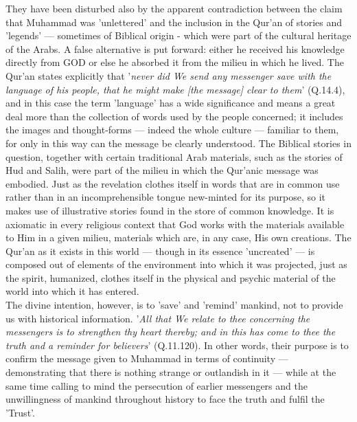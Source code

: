 \documentclass[11pt, b5paper, twoside]{book}
\begin{document}
They have been disturbed also by the apparent contradiction between the claim that Muhammad was 
'unlettered' and the inclusion in the Qur'an of stories and 'legends' --- sometimes of Biblical origin 
- which were part of the cultural heritage of the Arabs. A false alternative is put forward: either 
he received his knowledge directly from GOD or else he absorbed it from the milieu in which he lived. 
The Qur'an states explicitly that '\emph{never did We send any messenger save with the language of his 
people, that he might make [the message] clear to them}' (Q.14.4), and in this case the term 'language' 
has a wide significance and means a great deal more than the collection of words used by the people 
concerned; it includes the images and thought-forms --- indeed the whole culture --- familiar to them, 
for only in this way can the message be clearly understood. The Biblical stories in question, 
together with certain traditional Arab materials, such as the stories of Hud and Salih, were part of 
the milieu in which the Qur'anic message was embodied. Just as the revelation clothes itself in words 
that are in common use rather than in an incomprehensible tongue new-minted for its purpose, so it 
makes use of illustrative stories found in the store of common knowledge. It is axiomatic in every 
religious context that God works with the materials available to Him in a given milieu, materials 
which are, in any case, His own creations. The Qur'an as it exists in this world --- though in its 
essence 'uncreated' --- is composed out of elements of the environment into which it was projected, 
just as the spirit, humanized, clothes itself in the physical and psychic material of the world into 
which it has entered. \\

The divine intention, however, is to 'save' and 'remind' mankind, not to provide us with historical 
information. '\emph{All that We relate to thee concerning the messengers is to strengthen thy heart 
thereby; and in this has come to thee the truth and a reminder for believers}' (Q.11.120). In other 
words, their purpose is to confirm the message given to Muhammad in terms of continuity --- 
demonstrating that there is nothing strange or outlandish in it --- while at the same time calling to 
mind the persecution of earlier messengers and the unwillingness of mankind throughout history to 
face the truth and fulfil the 'Trust'. \\
\end{document}
